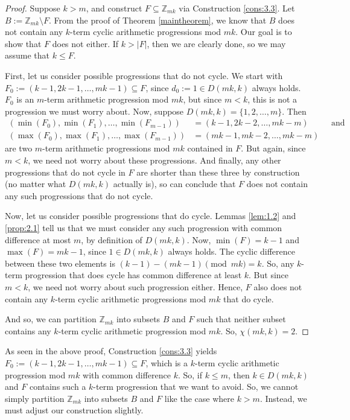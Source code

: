 \documentclass{article}
\theoremstyle{definition}
\theoremstyle{remark}
\begin{document}
\begin{proof}
    Suppose $k > m$, and construct $F \subseteq \mathbb{Z}_{mk}$ via Construction \ref{cons:3.3}. Let $B := \mathbb{Z}_{mk} \setminus F$. From the proof of Theorem \ref{maintheorem}, we know that $B$ does not contain any $k$-term cyclic arithmetic progressions mod $mk$. Our goal is to show that $F$ does not either. If $k > |F|$, then we are clearly done, so we may assume that $k \leq F$.  

    First, let us consider possible progressions that do not cycle. We start with
    $F_0 := (k-1,2k-1,\ldots,mk-1) \subseteq F$, since $d_0 :=1 \in D(mk,k)$ always holds. $F_0$ is an $m$-term arithmetic progression mod $mk$, but since $m < k$, this is not a progression we must worry about. Now, suppose $D(mk,k) = \{1,2,\ldots,m\}$. Then \begin{align*}
     (\min(F_0),\min(F_1),\ldots,\min(F_{m-1})) &= (k-1,2k-2,\ldots,mk-m) \qquad \ \ \  \text{and} \\
        (\max(F_0),\max(F_1),\ldots,\max(F_{m-1})) &= (mk-1,mk-2,\ldots,mk-m)
    \end{align*} are two $m$-term arithmetic progressions mod $mk$ contained in $F$. But again, since $m<k$, we need not worry about these progressions. And finally, any other progressions that do not cycle in $F$ are shorter than these three by construction (no matter what $D(mk,k)$ actually is), so can conclude that $F$ does not contain any such progressions that do not cycle.

    Now, let us consider possible progressions that do cycle. Lemmas \ref{lem:1.2} and \ref{prop:2.1} tell us that we must consider any such progression with common difference at most $m$, by definition of $D(mk,k)$. Now, $\min(F) = k-1$ and $\max(F) = mk-1$, since $1 \in D(mk,k)$ always holds. The cyclic difference between these two elements is $(k-1)-(mk-1) \pmod {mk} = k$. So, any $k$-term progression that does cycle has common difference at least $k$. But since $m < k$, we need not worry about such progression either. Hence, $F$ also does not contain any $k$-term cyclic arithmetic progressions mod $mk$ that do cycle.

    And so, we can partition $\mathbb{Z}_{mk}$ into subsets $B$ and $F$ such that neither subset contains any $k$-term cyclic arithmetic progression mod $mk$. So, $\chi(mk,k) = 2$.
\end{proof}

As seen in the above proof, Construction \ref{cons:3.3} yields $F_0 := (k-1,2k-1,\ldots,mk-1) \subseteq F$, which is a $k$-term cyclic arithmetic progression mod $mk$ with common difference $k$. So, if $k \leq m$, then $k \in D(mk,k)$ and $F$ contains such a $k$-term progression that we want to avoid. So, we cannot simply partition $\mathbb{Z}_{mk}$ into subsets $B$ and $F$ like the case where $k > m$. Instead, we must adjust our construction slightly.
\end{document}
